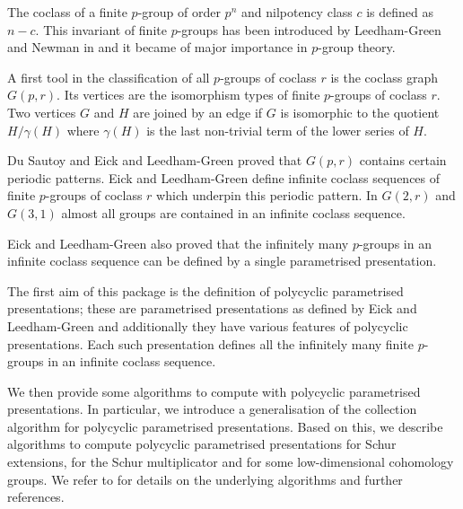 


The coclass of a finite $p$-group of order $p^n$ and nilpotency class $c$ is 
defined as $n-c$. This invariant of finite $p$-groups has been introduced by
Leedham-Green and Newman in \cite{LGN80} and it became of major importance
in $p$-group theory. 

A first tool in the classification of all $p$-groups of coclass $r$ is the
coclass graph $G(p,r)$. Its vertices are the isomorphism types of finite 
$p$-groups of coclass $r$. Two vertices $G$ and $H$ are joined by an edge if
$G$ is isomorphic to the quotient $H/\gamma(H)$ where $\gamma(H)$ is the last
non-trivial term of the lower series of $H$. 

Du Sautoy \cite{dS00} and Eick and Leedham-Green \cite{ELG08} proved that
$G(p,r)$ contains certain periodic patterns. Eick and Leedham-Green 
\cite{ELG08} define infinite coclass sequences of finite $p$-groups of 
coclass $r$ which underpin this periodic pattern. In $G(2,r)$ and $G(3,1)$
almost all groups are contained in an infinite coclass sequence. 

Eick and Leedham-Green \cite{ELG08} also proved that the infinitely many
$p$-groups in an infinite coclass sequence can be defined by a single 
parametrised presentation.

The first aim of this package is the definition of polycyclic parametrised
presentations; these are parametrised presentations as defined by Eick
and Leedham-Green \cite{ELG08} and additionally they have various features
of polycyclic presentations. Each such presentation defines all the 
infinitely many finite $p$-groups in an infinite coclass sequence.

We then provide some algorithms to compute with polycyclic parametrised
presentations. In particular, we introduce a generalisation of the
collection algorithm for polycyclic parametrised presentations. Based
on this, we describe algorithms to compute polycyclic parametrised
presentations for Schur extensions, for the Schur multiplicator and
for some low-dimensional cohomology groups. We refer to \cite{EF11}
for details on the underlying algorithms and further references.

